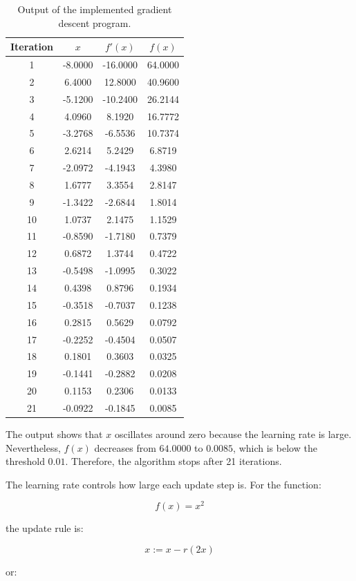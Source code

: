 \documentclass[12pt,a4paper]{article}
\begin{document}
\begin{table}[h]
\centering
\begin{tabular}{cccc}
\toprule
Iteration & \(x\) & \(f'(x)\) & \(f(x)\) \\
\midrule
1 & -8.0000 & -16.0000 & 64.0000 \\
2 & 6.4000 & 12.8000 & 40.9600 \\
3 & -5.1200 & -10.2400 & 26.2144 \\
4 & 4.0960 & 8.1920 & 16.7772 \\
5 & -3.2768 & -6.5536 & 10.7374 \\
6 & 2.6214 & 5.2429 & 6.8719 \\
7 & -2.0972 & -4.1943 & 4.3980 \\
8 & 1.6777 & 3.3554 & 2.8147 \\
9 & -1.3422 & -2.6844 & 1.8014 \\
10 & 1.0737 & 2.1475 & 1.1529 \\
11 & -0.8590 & -1.7180 & 0.7379 \\
12 & 0.6872 & 1.3744 & 0.4722 \\
13 & -0.5498 & -1.0995 & 0.3022 \\
14 & 0.4398 & 0.8796 & 0.1934 \\
15 & -0.3518 & -0.7037 & 0.1238 \\
16 & 0.2815 & 0.5629 & 0.0792 \\
17 & -0.2252 & -0.4504 & 0.0507 \\
18 & 0.1801 & 0.3603 & 0.0325 \\
19 & -0.1441 & -0.2882 & 0.0208 \\
20 & 0.1153 & 0.2306 & 0.0133 \\
21 & -0.0922 & -0.1845 & 0.0085 \\
\bottomrule
\end{tabular}
\caption{Output of the implemented gradient descent program.}
\end{table}

The output shows that \(x\) oscillates around zero because the learning rate is large.
Nevertheless, \(f(x)\) decreases from \(64.0000\) to \(0.0085\), which is below the threshold \(0.01\).
Therefore, the algorithm stops after 21 iterations.

The learning rate controls how large each update step is.
For the function:

\[
f(x) = x^2
\]

the update rule is:

\[
x := x - r(2x)
\]

or:
\end{document}
